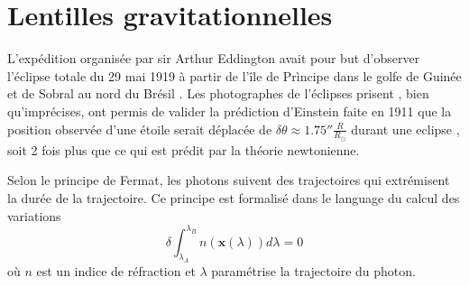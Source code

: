 \section{Lentilles gravitationnelles}\label{sec:lentilles gravitationnelles}

L'expédition organisée par sir Arthur Eddington 
avait pour but d'observer 
l'éclipse totale du 29 mai 1919 à partir de l'île de Prìncipe 
dans le golfe de Guinée et de Sobral au nord du Brésil 
\citep{Eddington1919}. Les photographes de l'éclipses prisent , bien qu'imprécises, 
ont permis de valider la prédiction d'Einstein faite 
en 1911 que la position observée d'une étoile serait déplacée de 
$\delta \theta \approx 1.75'' \frac{R}{R_\odot}$ 
durant une eclipse \citep{Dyson1920}, soit 2 fois plus 
que ce qui est prédit par la théorie newtonienne.




Selon le principe de Fermat, les photons suivent des trajectoires qui extrémisent 
la durée de la trajectoire. Ce principe est formalisé dans le language du calcul 
des variations
\begin{equation}\label{eq:Fermat}
        \delta \int_{\lambda_A}^{\lambda_B} n(\mathbf{x}(\lambda))d\lambda = 0 
\end{equation} 
où $n$ est un indice de réfraction et $\lambda$ paramétrise la trajectoire du photon.

